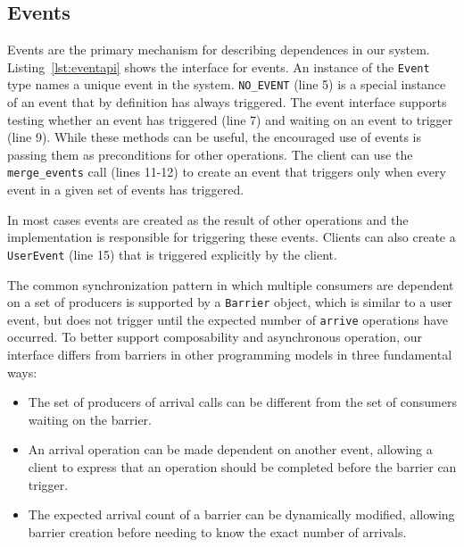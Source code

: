 \subsection{Events}
\label{subsec:events}
Events are the primary mechanism for describing dependences in our system.
Listing~\ref{lst:eventapi} shows the interface for events.  An instance of the {\tt Event} type 
names a unique event in the system.  {\tt NO\_EVENT} (line 5) is a special instance
of an event that by definition has always triggered.  The event interface
supports testing whether an event has triggered (line 7) and waiting on
an event to trigger (line 9).  While these methods can be useful, the encouraged
use of events is passing them as preconditions for other operations.  The client can use the
{\tt merge\_events} call (lines 11-12) to create an event that triggers only when every
event in a given set of events has triggered.

In most cases events are created as the result of other
operations and the implementation is responsible for triggering these events.  Clients
can also create a {\tt UserEvent} (line 15) that is triggered explicitly by the client.

The common synchronization pattern in which multiple consumers are dependent on
a set of producers is supported by a {\tt Barrier} object, which is similar
to a user event, but does not trigger until the expected number of {\tt arrive}
operations have occurred.  To better support
composability and asynchronous operation, our interface differs from barriers in other programming
models\cite{MPI} in three fundamental ways:
\begin{itemize} \itemsep1pt \parskip0pt 
\item The set of producers of arrival calls can be different from the set of consumers waiting on the barrier.
\item An arrival operation can be made dependent on another event, allowing a client to
express that an operation should be completed before the barrier can trigger.
\item The expected arrival count of a barrier can be dynamically modified, allowing
barrier creation before needing to know the exact number of arrivals.
\end{itemize}

